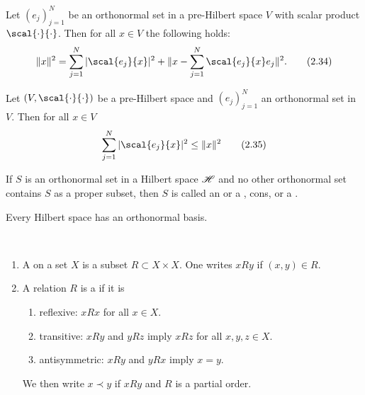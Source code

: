 \begin{lem}[Pythagoras]\label{ii.13}
    Let $(e_j)_{j=1}^N$ be an orthonormal set in a pre-Hilbert space $V$ with scalar product $\scal{\cdot}{\cdot}$. Then for all $x\in V$ the following holds:
    \[\|x\|^2=\sum_{j=1}^N|\scal{e_j}{x}|^2+\|x-\sum_{j=1}^N\scal{e_j}{x}e_j\|^2.\tag{2.34}\label{2.34}\]
\end{lem}

\begin{cor}\label{ii.14}
    Let $(V,\scal{\cdot}{\cdot})$ be a pre-Hilbert space and $(e_j)_{j=1}^N$ an orthonormal set in $V$. Then for all $x\in V$
    \[\sum_{j=1}^N|\scal{e_j}{x}|^2\leq\|x\|^2\tag{2.35}\label{2.35}\]
\end{cor}

\begin{definition}\label{ii.15}
    If $S$ is an orthonormal set in a Hilbert space $\mathscr{H}$ and no other orthonormal set contains $S$ as a proper subset, then $S$ is called an  \rec{(}or a , cons, or a \rec{)}.
\end{definition}

\begin{thm}\label{ii.16}
    Every Hilbert space has an orthonormal basis.
\end{thm}

\begin{definition}\label{ii.17}\ 
    \begin{enumerate}[label=\arabic*)]
        \item A  on a set $X$ is a subset $R\subset X\times X$. One writes $xRy$ if $(x,y)\in R$.
        \item A relation $R$ is a \bol{partial order} if it is
        \begin{enumerate}[label=\alph*)]
            \item reflexive: $xRx$ for all $x\in X$.\label{ii.17.a}
            \item transitive: $xRy$ and $yRz$ imply $xRz$ for all $x,y,z\in X$.\label{ii.17.b}
            \item antisymmetric: $xRy$ and $yRx$ imply $x=y$.\label{ii.17.c}
        \end{enumerate}
        We then write $x\prec y$ if $xRy$ and $R$ is a partial order.
    \end{enumerate}
\end{definition}

